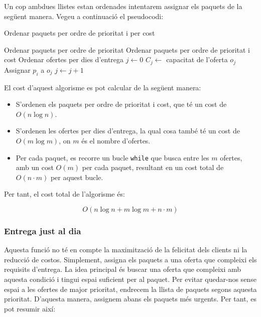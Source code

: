 \documentclass[a4paper]{article}
\begin{document}
	Un cop ambdues llistes estan ordenades intentarem assignar els paquets de la següent manera. Vegeu a continuació el pseudocodi:
	
	\begin{algorithm} [H]
		\caption{Ordenar paquets per ordre de prioritat i per cost}
		\begin{algorithmic}[1]
			\State Ordenar paquets per ordre de prioritat
			\State Ordenar paquets per ordre de prioritat i cost
			\State Ordenar ofertes per dies d'entrega
			\State $j \gets 0$
			\State $C_j \gets$ capacitat de l'oferta $o_j$
			\State Assignar $p_i$ a $o_j$
			\Else
			\State $j \gets j + 1$ 
			\EndIf
			\EndWhile
			\EndFor
		\end{algorithmic}
	\end{algorithm}
	
	El cost d'aquest algorisme es pot calcular de la següent manera:
	
	\begin{itemize}
		\item S'ordenen els paquets per ordre de prioritat i cost, que té un cost de $O(n \log n)$.
		\item S'ordenen les ofertes per dies d'entrega, la qual cosa també té un cost de $O(m \log m)$, on $m$ és el nombre d'ofertes.
		\item Per cada paquet, es recorre un bucle \texttt{while} que busca entre les $m$ ofertes, amb un cost $O(m)$ per cada paquet, resultant en un cost total de $O(n \cdot m)$ per aquest bucle.
	\end{itemize}
	
	Per tant, el cost total de l'algorisme és:
	
	\[
	O(n \log n + m \log m + n \cdot m)
	\]
	
	\subsubsection{Entrega just al dia}
	\label{sec:GenSolIni_dia}
	
	Aquesta funció no té en compte la maximització de la felicitat dels clients ni la reducció de costos. Simplement, assigna els paquets a una oferta que compleixi els requisits d'entrega. La idea principal és buscar una oferta que compleixi amb aquesta condició i tingui espai suficient per al paquet. Per evitar quedar-nos sense espai a les ofertes de major prioritat, endrecem la llista de paquets segons aquesta prioritat. D'aquesta manera, assignem abans els paquets més urgents. Per tant, es pot resumir així:
	
\end{document}
